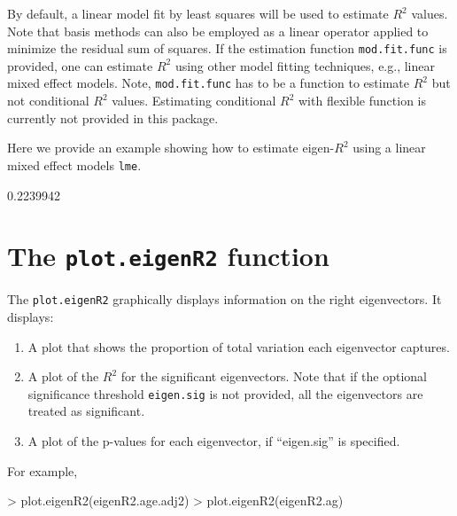 \documentclass[11pt]{article}
\newcommand{\Rfunction}[1]{{\texttt{#1}}}
\begin{document}
By default, a linear model fit by least squares will be used to estimate $R^2$ values. Note that basis methods can also be employed as a linear operator applied to minimize the residual sum of squares. If the estimation function \texttt{mod.fit.func} is provided, one can estimate $R^2$ using other model fitting techniques, e.g., linear mixed effect models. Note, \texttt{mod.fit.func} has to be a function to estimate $R^2$ but not conditional $R^2$ values. Estimating conditional $R^2$ with flexible function is currently not provided in this package. 

Here we provide an example showing how to estimate eigen-$R^2$ using a linear mixed effect models \Rfunction{lme}. 

\begin{Schunk}
\begin{Soutput}
[1] 0.2239942
\end{Soutput}
\end{Schunk}



\section{The \Rfunction{plot.eigenR2} function}

The \Rfunction{plot.eigenR2} graphically displays information on the right eigenvectors. It displays:  
\begin{enumerate}
    \item A plot that shows the proportion of total variation each eigenvector captures.
    \item A plot of the $R^2$ for the significant eigenvectors. Note that if the optional significance threshold \texttt{eigen.sig} is not provided, all the eigenvectors are treated as significant.
    \item A plot of the p-values for each eigenvector, if ``eigen.sig'' is specified.
\end{enumerate}

For example, 
\begin{Schunk}
\begin{Sinput}
> plot.eigenR2(eigenR2.age.adj2)
> plot.eigenR2(eigenR2.ag)
\end{Sinput}
\end{Schunk}
\end{document}
